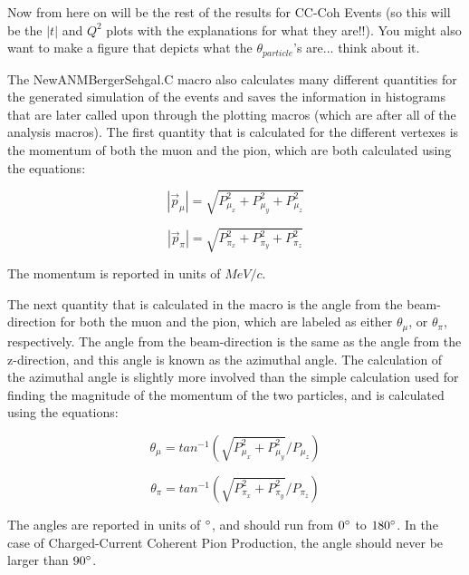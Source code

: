 \documentclass[11pt]{article}
\begin{document}
Now from here on will be the rest of the results for CC-Coh Events (so this will be the $|t|$ and $Q^2$ plots with the explanations for what they are!!). You might also want to make a figure that depicts what the $\theta_{particle}$'s are... think about it.

The NewANMBergerSehgal.C macro also calculates many different quantities for the generated simulation of the events and saves the information in histograms that are later called upon through the plotting macros (which are after all of the analysis macros). The first quantity that is calculated for the different vertexes is the momentum of both the muon and the pion, which are both calculated using the equations:

\begin{equation}
|\vec{p}_\mu| = \sqrt{P_{\mu_x}^2 + P_{\mu_y}^2 + P_{\mu_z}^2}
\end{equation}

\begin{equation}
|\vec{p}_\pi| = \sqrt{P_{\pi_x}^2 + P_{\pi_y}^2 + P_{\pi_z}^2}
\end{equation}

\noindent
The momentum is reported in units of $MeV/c$.

The next quantity that is calculated in the macro is the angle from the beam-direction for both the muon and the pion, which are labeled as either $\theta_\mu$, or $\theta_\pi$, respectively. The angle from the beam-direction is the same as the angle from the z-direction, and this angle is known as the azimuthal angle. The calculation of the azimuthal angle is slightly more involved than the simple calculation used for finding the magnitude of the momentum of the two particles, and is calculated using the equations:

\begin{equation}
\theta_\mu = tan^{-1}(\sqrt{P_{\mu_x}^2 + P_{\mu_y}^2}/{P_{\mu_z}})
\end{equation}

\begin{equation}
\theta_\pi = tan^{-1}(\sqrt{P_{\pi_x}^2 + P_{\pi_y}^2}/{P_{\pi_z}})
\end{equation}

\noindent
The angles are reported in units of $\degree$, and should run from $0\degree$ to $180\degree$. In the case of Charged-Current Coherent Pion Production, the angle should never be larger than $90\degree$.
\end{document}
